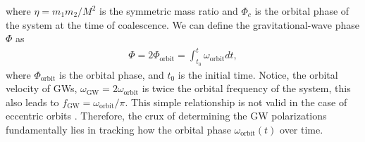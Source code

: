 where $\eta = m_1m_2/M^2$ is the symmetric mass ratio and $\Phi_c$ is the orbital phase of the system at the time of coalescence.  We can define the gravitational-wave phase $\Phi$ as  
\begin{align}
    \Phi = 2\Phi_{\text{orbit}} = \int_{t_0}^{t} \omega_{\text{orbit}} dt,
    \label{Eq:GW-phase-integral-circular}
\end{align}
where $\Phi_{\text{orbit}}$ is the orbital phase, and $t_0$ is the initial time. Notice, the orbital velocity of GWs, $\omega_{\text{GW}} = 2\omega_{\text{orbit}}$ is twice the orbital frequency of the system, this also leads to $f_{\text{GW}} = \omega_{\text{orbit}}/\pi$. This simple relationship is not valid in the case of eccentric orbits \cite{Peters:1964zz}. Therefore, the crux of determining the GW polarizations fundamentally lies in tracking how the orbital phase $\omega_{\text{orbit}}(t)$ over time.

